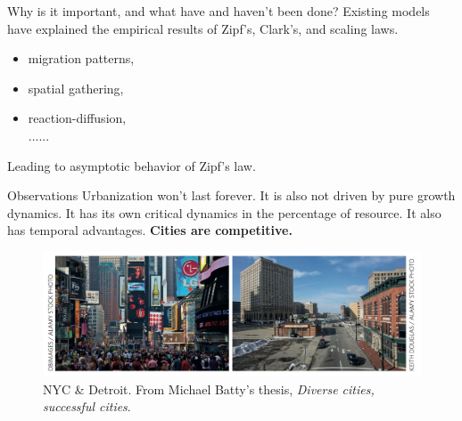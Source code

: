 \begin{frame}{Why is it important, and what have and haven't been done?}
    Existing models have explained the empirical results of Zipf's, Clark's, and scaling laws.
    \begin{itemize}
        \item migration patterns\cite{PhysRevLett.120.108701},
        \item spatial gathering\cite{Li2017Simple}, 
        \item reaction-diffusion\cite{marsili1998interacting}, 
        \\ ......
    \end{itemize}
    Leading to asymptotic behavior of Zipf's law. 
    
    \vspace{0.5cm}
    \begin{center}
    \end{center}
    
\end{frame}

\begin{frame}{Observations}
Urbanization won't last forever. It is also not driven by pure growth dynamics. It has its own critical dynamics in the percentage of resource. It also has temporal advantages. \textbf{Cities are competitive.}
    \begin{figure}
        \centering
        \includegraphics[width = 1\linewidth]{Pics/batty_nyc_detroit.png}
        \caption{NYC \& Detroit. From Michael Batty's thesis, \textit{Diverse cities, successful cities}\cite{batty2017urban}.}
        \label{fig:batty's}
    \end{figure}
    \begin{center}
    \end{center}
\end{frame}


